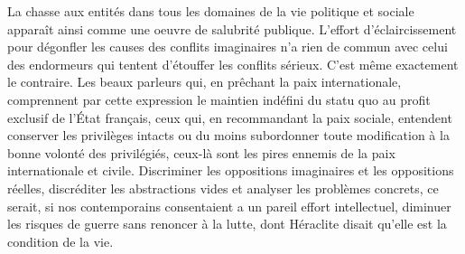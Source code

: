 \documentclass[french,twoside]{book} %
\begin{document}
La chasse aux entités dans tous les domaines de la vie politique et sociale apparaît ainsi comme une oeuvre de salubrité publique. L'effort d'éclaircissement pour dégonfler les causes des conflits imaginaires n'a rien de commun avec celui des endormeurs qui tentent d'étouffer les conflits sérieux. C'est même exactement le contraire. Les beaux parleurs qui, en prêchant la paix internationale, comprennent par cette expression le maintien indéfini du statu quo au profit exclusif de l'État français, ceux qui, en recommandant la paix sociale, entendent conserver les privilèges intacts ou du moins subordonner toute modification à la bonne volonté des privilégiés, ceux-là sont les pires ennemis de la paix internationale et civile. Discriminer les oppositions imaginaires et les oppositions réelles, discréditer les abstractions vides et analyser les problèmes concrets, ce serait, si nos contemporains consentaient a un pareil effort intellectuel, diminuer les risques de guerre sans renoncer à la lutte, dont Héraclite disait qu'elle est la condition de la vie.
\end{document}
